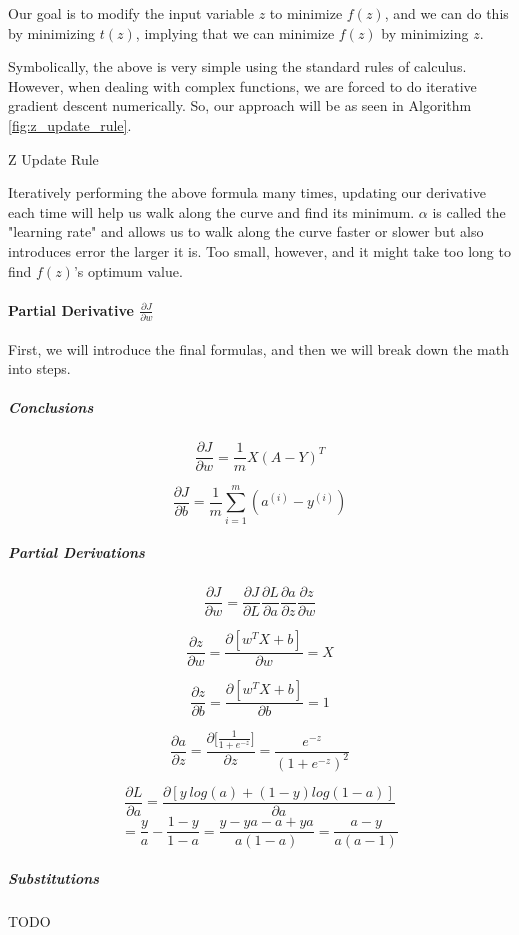 \documentclass{article}
\newcommand{\myparagraph}[1]{\paragraph{#1}\mbox{}}
\newcommand{\mysubparagraph}[1]{\subparagraph{#1}\mbox{}}
\begin{document}
Our goal is to modify the input variable $z$ to minimize $f(z)$, and we can do this by minimizing $t(z)$, implying that we can minimize $f(z)$ by minimizing $z$.

Symbolically, the above is very simple using the standard rules of calculus.  However, when dealing with complex functions, we are forced to do iterative gradient descent numerically.  So, our approach will be as seen in Algorithm \ref{fig:z_update_rule}.

\begin{algorithm}[h]
\caption{Z Update Rule}
\label{fig:z_update_rule}
\end{algorithm}

Iteratively performing the above formula many times, updating our derivative each time will help us walk along the curve and find its minimum.  $\alpha$ is called the "learning rate" and allows us to walk along the curve faster or slower but also introduces error the larger it is.  Too small, however, and it might take too long to find $f(z)$'s optimum value.

\myparagraph{Partial Derivative $\frac{\partial{J}}{\partial{w}}$}

First, we will introduce the final formulas, and then we will break down the math into steps.

\mysubparagraph{Conclusions}
$$\frac{\partial{J}}{\partial{w}} = \frac{1}{m}X(A-Y)^{T}$$

$$\frac{\partial{J}}{\partial{b}} = \frac{1}{m} \sum_{i=1}^{m}(a^{(i)} - y^{(i)})$$

\mysubparagraph{Partial Derivations}
$$\frac{\partial{J}}{\partial{w}} = \frac{\partial{J}}{\partial{L}}\frac{\partial{L}}{\partial{a}}\frac{\partial{a}}{\partial{z}}\frac{\partial{z}}{\partial{w}}$$

$$\frac{\partial{z}}{\partial{w}} = \frac{\partial{[w^TX + b]}}{\partial{w}} = X$$

$$\frac{\partial{z}}{\partial{b}} = \frac{\partial{[w^{T} X + b]}}{\partial{b}} = 1$$

$$\frac{\partial{a}}{\partial{z}} = \frac{\partial{[\frac{1}{1 + e^{-z}}}]}{\partial{z}} = \frac{e^{-z}}{(1+e^{-z})^{2}}$$

$$\frac{\partial{L}}{\partial{a}} = \frac{\partial{[y\ log(a) + (1-y) log (1-a)]}}{\partial{a}}$$
$$= \frac{y}{a} - \frac{1-y}{1-a} = \frac{y-ya-a+ya}{a(1-a)} = \frac{a-y}{a(a-1)}$$

\mysubparagraph{Substitutions}

TODO
\end{document}

